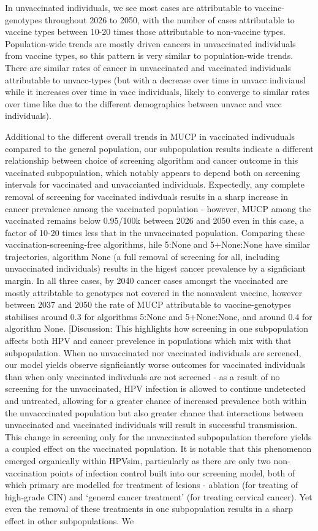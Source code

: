 In unvaccinated individuals, we see most cases are attributable to vaccine-genotypes throughout 2026 to 2050, with the number of cases attributable to vaccine types between 10-20 times those attributable to non-vaccine types. Population-wide trends are mostly driven cancers in unvaccinated individuals from vaccine types, so this pattern is very similar to population-wide trends. There are similar rates of cancer in unvaccinated and vaccinated individuals attributable to unvacc-types (but with a decrease over time in unvacc indiviausl while it increases over time in vacc individuals, likely to converge to similar rates over time like due to the different demographics between unvacc and vacc individuals).


Additional to the different overall trends in MUCP in vaccinated indivuduals compared to the general population, our subpopulation results indicate a different relationship between choice of screening algorithm and cancer outcome in this vaccinated subpopulation, which notably appears to depend both on screening intervals for vaccinated and unvaccianted individuals. Expectedly, any complete removal of screening for vaccinated indivduals results in a sharp increase in cancer prevalence among the vaccinated population - however, MUCP among the vaccinated remains below 0.95/100k between 2026 and 2050 even in this case, a factor of 10-20 times less that in the unvaccinated population. Comparing these vaccination-screening-free algorithms, hile 5:None and 5+None:None have similar trajectories, algorithm None (a full removal of screening for all, including unvaccinated individuals) results in the higest cancer prevalence by a signficiant margin. In all three cases, by 2040 cancer cases amongst the vaccinated are mostly attribtable to genotypes not covered in the nonavalent vaccine, however between 2037 and 2050 the rate of MUCP attributable to vaccine-genotypes stabilises around 0.3 for algorithms 5:None and 5+None:None, and around 0.4 for algorithm None. [Discussion: This highlights how screening in one subpopulation affects both HPV and cancer prevelence in populations which mix with that subpopulation. When no unvaccinated nor vaccinated individuals are screened, our model yields observe signficiantly worse outcomes for vaccinated individuals than when only vaccinated indivduals are not screened - as a result of no screening for the unvaccinated, HPV infection is allowed to continue undetected and untreated, allowing for a greater chance of increased prevalence both within the unvacccinated population but also greater chance that interactions between unvaccinated and vaccinated individuals will result in successful transmission. This change in screening only for the unvaccinated subpopulation therefore yields a coupled effect on the vaccinated population. It is notable that this phenomenon emerged organically within HPVsim, particularly as there are only two non-vaccination points of infection control built into our screening model, both of which primary are modelled for treatment of lesions - ablation (for treating of high-grade CIN) and `general cancer treatment' (for treating cervical cancer). Yet even the removal of these treatments in one subpopulation results in a sharp effect in other subpopulations. We 